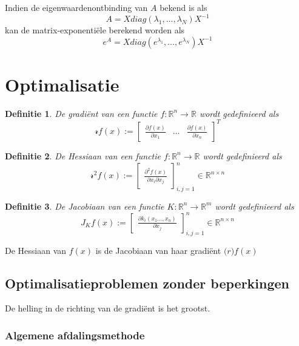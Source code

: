 \documentclass{article}
\newtheorem{mydef}{Definitie}
\begin{document}
	Indien de eigenwaardenontbinding van $A$ bekend is als
	$$
	 A = X diag(\lambda_1, ... , \lambda_N) X^{-1}
	$$
	kan de matrix-exponentiële berekend worden als
	$$
		e^A = X diag(e^{\lambda_1}, ... , e^{\lambda_N}) X^{-1}
	$$
	
	\section{Optimalisatie}
	
	\begin{mydef}
		De gradiënt van een functie $f: \mathbb{R}^n \to \mathbb{R}$ wordt gedefinieerd als
		$$
		\mathcal{r} f(x) :=
		\begin{bmatrix}
		\frac{\partial f(x)}{\partial x_1} & ... & \frac{\partial f(x)}{\partial x_n}
		\end{bmatrix}^T
		$$
	\end{mydef}
	
	\begin{mydef}
		De Hessiaan van een functie $f: \mathbb{R}^n \to \mathbb{R}$ wordt gedefinieerd als
		$$
		\mathcal{r}^2 f(x) :=
		\begin{bmatrix}
		\frac{\partial^2 f(x)}{\partial x_i \partial x_j}
		\end{bmatrix}_{i,j=1}^n
		\in \mathbb{R}^{n\times n}
		$$
	\end{mydef}
	
	\begin{mydef}
		De Jacobiaan van een functie $K: \mathbb{R}^n \to \mathbb{R}^m$ wordt gedefinieerd als
		$$
		J_Kf(x) :=
		\begin{bmatrix}
		\frac{\partial k_i (x_1 ..., x_n)}{\partial x_j}
		\end{bmatrix}_{i,j=1}^n
		\in \mathbb{R}^{n\times n}
		$$
	\end{mydef}
	
	De Hessiaan van $f(x)$ is de Jacobiaan van haar gradiënt $\mathcal(r) f(x)$
	
	\subsection{Optimalisatieproblemen zonder beperkingen}
	
	De helling in de richting van de gradiënt is het grootst.
	
	\subsubsection{Algemene afdalingsmethode}
	
\end{document}
